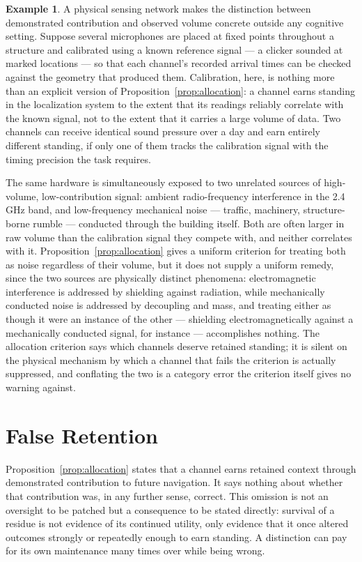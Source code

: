 \documentclass[11pt]{amsart}
\theoremstyle{plain}
\theoremstyle{definition}
\newtheorem{example}[theorem]{Example}
\theoremstyle{remark}
\begin{document}
\begin{example}
\label{ex:mic-array}
A physical sensing network makes the distinction between demonstrated
contribution and observed volume concrete outside any cognitive
setting. Suppose several microphones are placed at fixed points
throughout a structure and calibrated using a known reference signal
--- a clicker sounded at marked locations --- so that each channel's
recorded arrival times can be checked against the geometry that
produced them. Calibration, here, is nothing more than an explicit
version of Proposition~\ref{prop:allocation}: a channel earns standing
in the localization system to the extent that its readings reliably
correlate with the known signal, not to the extent that it carries a
large volume of data. Two channels can receive identical sound
pressure over a day and earn entirely different standing, if only one
of them tracks the calibration signal with the timing precision the
task requires.

The same hardware is simultaneously exposed to two unrelated sources of
high-volume, low-contribution signal: ambient radio-frequency
interference in the 2.4 GHz band, and low-frequency mechanical noise
--- traffic, machinery, structure-borne rumble --- conducted through
the building itself. Both are often larger in raw volume than the
calibration signal they compete with, and neither correlates with it.
Proposition~\ref{prop:allocation} gives a uniform criterion for
treating both as noise regardless of their volume, but it does not
supply a uniform remedy, since the two sources are physically distinct
phenomena: electromagnetic interference is addressed by shielding
against radiation, while mechanically conducted noise is addressed by
decoupling and mass, and treating either as though it were an instance
of the other --- shielding electromagnetically against a mechanically
conducted signal, for instance --- accomplishes nothing. The allocation
criterion says which channels deserve retained standing; it is silent
on the physical mechanism by which a channel that fails the criterion
is actually suppressed, and conflating the two is a category error the
criterion itself gives no warning against.
\end{example}

\section{False Retention}

Proposition~\ref{prop:allocation} states that a channel earns retained
context through demonstrated contribution to future navigation. It says
nothing about whether that contribution was, in any further sense,
correct. This omission is not an oversight to be patched but a
consequence to be stated directly: survival of a residue is not
evidence of its continued utility, only evidence that it once altered
outcomes strongly or repeatedly enough to earn standing. A distinction
can pay for its own maintenance many times over while being wrong.
\end{document}
